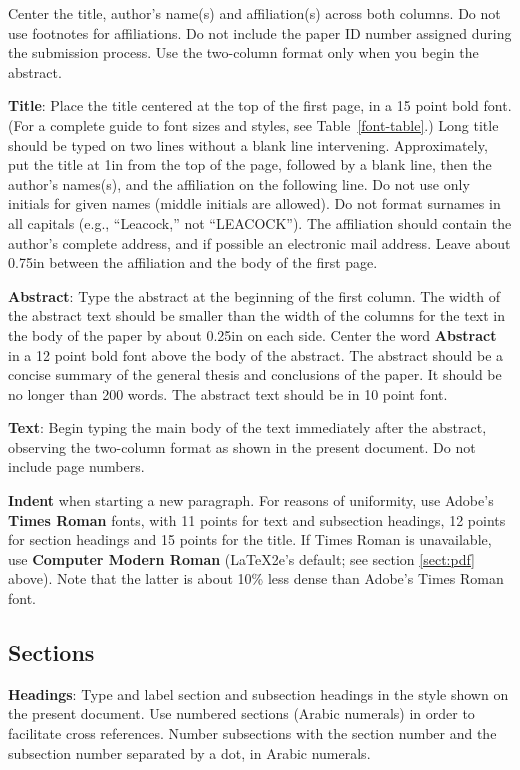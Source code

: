\documentclass[11pt,letterpaper]{article}
\begin{document}
Center the title, author's name(s) and affiliation(s) across both
columns. Do not use footnotes for affiliations.  Do not include the
paper ID number assigned during the submission process. 
Use the two-column format only when you begin the abstract.

{\bf Title}: Place the title centered at the top of the first page, in
a 15 point bold font.  (For a complete guide to font sizes and styles, see Table~\ref{font-table}.)
Long title should be typed on two lines without
a blank line intervening. Approximately, put the title at 1in from the
top of the page, followed by a blank line, then the author's names(s),
and the affiliation on the following line.  Do not use only initials
for given names (middle initials are allowed). Do not format surnames
in all capitals (e.g., ``Leacock,'' not ``LEACOCK'').  The affiliation should
contain the author's complete address, and if possible an electronic
mail address. Leave about 0.75in between the affiliation and the body
of the first page.

{\bf Abstract}: Type the abstract at the beginning of the first
column.  The width of the abstract text should be smaller than the
width of the columns for the text in the body of the paper by about
0.25in on each side.  Center the word {\bf Abstract} in a 12 point
bold font above the body of the abstract. The abstract should be a
concise summary of the general thesis and conclusions of the paper.
It should be no longer than 200 words.  The abstract text should be in 10 point font.

{\bf Text}: Begin typing the main body of the text immediately after
the abstract, observing the two-column format as shown in 
the present document.  Do not include page numbers.

{\bf Indent} when starting a new paragraph. For reasons of uniformity,
use Adobe's {\bf Times Roman} fonts, with 11 points for text and 
subsection headings, 12 points for section headings and 15 points for
the title.  If Times Roman is unavailable, use {\bf Computer Modern
  Roman} (\LaTeX2e{}'s default; see section \ref{sect:pdf} above).
Note that the latter is about 10\% less dense than Adobe's Times Roman
font.

\subsection{Sections}

{\bf Headings}: Type and label section and subsection headings in the
style shown on the present document.  Use numbered sections (Arabic
numerals) in order to facilitate cross references. Number subsections
with the section number and the subsection number separated by a dot,
in Arabic numerals. 
\end{document}
